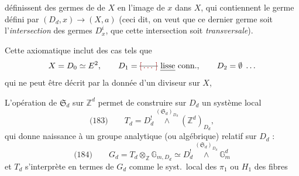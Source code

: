 \documentclass[11pt,a4paper]{article}
\begin{document}
définissent des germes de   de $X$ en l'image
de $x$ dans $X$, qui contiennent le germe défini par $(D_d, x) \to (X, a)$
(ceci dit, on veut que ce dernier germe soit l'\emph{intersection} des germes
$D^{i}_x$,  \ill{} que cette intersection soit \emph{transversale}).

Cette axiomatique inclut des cas tels que
\[
  X = D_0 \simeq E^2, \qquad D_1 = \text{\struck{\ill{}}\ \emph{lisse} conn.}, \qquad D_2 = \emptyset \;\ldots
\]
qui ne peut être décrit par la donnée d'un diviseur sur $X$,
\struck{\ill{} \ill{}} 

L'opération de $\mathfrak{S}_d$ sur $\mathbb{Z}^d$ permet de construire sur $D_d$
un système local
\[
  \text{(183)}\qquad T_d = D^{!}_d \overset{(\mathfrak{S}_d)_{D_d}}{\wedge} (\mathbb{Z}^d)_{D_d} ,
\]
qui donne naissance à un groupe analytique (ou algébrique) relatif sur $D_d$ :
\[
  \text{(184)}\qquad G_d = T_d \otimes_{\mathbb{Z}} \mathbb{G}_{m, D_d}
  \simeq D^{!}_d \overset{(\mathfrak{S}_d)_{D_d}}{\wedge} \mathbb{G}_m^d
\]
\struck{\ill{}} et $T_d$ s'interprète en termes de $G_d$ comme le syst.\ local des
$\pi_1$ ou $H_1$ des fibres
\end{document}
